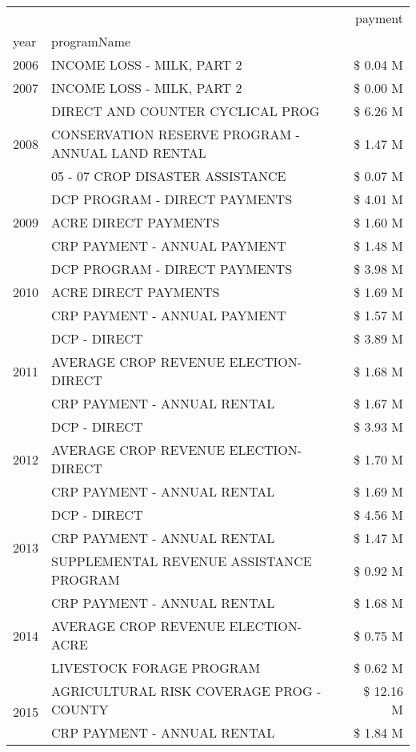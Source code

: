 \begin{tabular}{llr}
\toprule
 &  & payment \\
year & programName &  \\
\midrule
2006 & INCOME LOSS - MILK, PART 2 & \$ 0.04 M \\
\cline{1-3}
2007 & INCOME LOSS - MILK, PART 2 & \$ 0.00 M \\
\cline{1-3}
\multirow[t]{3}{*}{2008} & DIRECT AND COUNTER CYCLICAL PROG & \$ 6.26 M \\
 & CONSERVATION RESERVE PROGRAM - ANNUAL LAND RENTAL & \$ 1.47 M \\
 & 05 - 07 CROP DISASTER ASSISTANCE & \$ 0.07 M \\
\cline{1-3}
\multirow[t]{3}{*}{2009} & DCP PROGRAM - DIRECT PAYMENTS & \$ 4.01 M \\
 & ACRE DIRECT PAYMENTS & \$ 1.60 M \\
 & CRP PAYMENT - ANNUAL PAYMENT & \$ 1.48 M \\
\cline{1-3}
\multirow[t]{3}{*}{2010} & DCP PROGRAM - DIRECT PAYMENTS & \$ 3.98 M \\
 & ACRE DIRECT PAYMENTS & \$ 1.69 M \\
 & CRP PAYMENT - ANNUAL PAYMENT & \$ 1.57 M \\
\cline{1-3}
\multirow[t]{3}{*}{2011} & DCP - DIRECT & \$ 3.89 M \\
 & AVERAGE CROP REVENUE ELECTION-DIRECT & \$ 1.68 M \\
 & CRP PAYMENT - ANNUAL RENTAL & \$ 1.67 M \\
\cline{1-3}
\multirow[t]{3}{*}{2012} & DCP - DIRECT & \$ 3.93 M \\
 & AVERAGE CROP REVENUE ELECTION-DIRECT & \$ 1.70 M \\
 & CRP PAYMENT - ANNUAL RENTAL & \$ 1.69 M \\
\cline{1-3}
\multirow[t]{3}{*}{2013} & DCP - DIRECT & \$ 4.56 M \\
 & CRP PAYMENT - ANNUAL RENTAL & \$ 1.47 M \\
 & SUPPLEMENTAL REVENUE ASSISTANCE PROGRAM & \$ 0.92 M \\
\cline{1-3}
\multirow[t]{3}{*}{2014} & CRP PAYMENT - ANNUAL RENTAL & \$ 1.68 M \\
 & AVERAGE CROP REVENUE ELECTION-ACRE & \$ 0.75 M \\
 & LIVESTOCK FORAGE PROGRAM & \$ 0.62 M \\
\cline{1-3}
\multirow[t]{3}{*}{2015} & AGRICULTURAL RISK COVERAGE PROG - COUNTY & \$ 12.16 M \\
 & CRP PAYMENT - ANNUAL RENTAL & \$ 1.84 M \\

\end{tabular}
